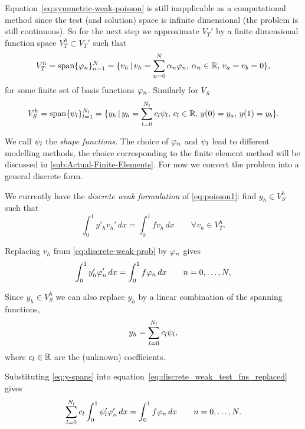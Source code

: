 Equation~\eqref{eq:symmetric-weak-poisson} is still inapplicable as a
computational method since the test (and solution) space is infinite dimensional
(\ie the problem is still continuous). So for the next step we approximate
$V_{T}'$ by a finite dimensional function space $V_{T}^{h}\subset V_{T}'$ such
that
\begin{equation}
  V_{T}^{h}=\text{span} \{ \varphi_{n} \}_{n=1}^{N}
  =  \{v_h \,|\, v_h = \sum_{n=0}^{N}\alpha_{n} \varphi_{n},\, \alpha_{n} \in \mathbb{R},\, v_a = v_b =0 \},
  \label{eq:30}
\end{equation}
for some finite set of basis functions $\varphi_{n}$. Similarly for $V_S$
\begin{equation}
  \label{eq:34}
  V_{S}^{h}=\text{span} \{ \psi_{l} \}_{l=1}^{N_l}
  =  \{y_h \,|\, y_h = \sum_{l=0}^{N_l}c_{l} \psi_{l},\,
  c_{l} \in \mathbb{R},\, y(0) = y_a,\, y(1) = y_b \}.
\end{equation}

We call $\psi_l$ the \emph{shape functions}. The choice of $\varphi_{n}$
and $\psi_l$ lead to different modelling methods, the choice corresponding
to the finite element method will be discussed in \autoref{sub:Actual-Finite-Elements}. For now we convert the problem into a general discrete form.

We currently have the \emph{discrete weak formulation} of \eqref{eq:poisson1}: find $y_{h}\in V_{S}^{h}$ such that
\begin{equation}
  \int_{0}^{1}y'_{h}v_{h}'\, dx=\int_{0}^{1}fv_{h}\, dx\qquad\forall v_{h}\in V_{T}^{h}.
  \label{eq:discrete-weak-prob}
\end{equation}

Replacing $v_{h}$ from \eqref{eq:discrete-weak-prob} by $\varphi_{n}$
gives
\begin{equation}
  \int_{0}^{1} y'_{h} \varphi_{n}' \, dx = \int_{0}^{1}f\varphi_{n}\, dx\qquad n=0,\ldots,N,
  \label{eq:discrete_weak_test_fns_replaced}
\end{equation}

Since $y_{h}\in V_{S}^{h}$ we can also replace $y_{h}$ by a linear combination
of the spanning functions, \ie
\begin{equation}
  y_{h}=\sum_{l=0}^{N_l}c_{l}\psi_{l},
  \label{eq:y-spans}
\end{equation}
where $c_l \in \mathbb{R}$ are the (unknown) coefficients.

Substituting \eqref{eq:y-spans} into equation~\eqref{eq:discrete_weak_test_fns_replaced} gives
\begin{equation}
  \sum_{l=0}^{N_l}c_{l}\int_{0}^{1}\psi_{l}'\varphi'_{n}\, dx=\int_{0}^{1}f\varphi_{n}\, dx
  \qquad n=0,\ldots,N.
  \label{eq:31}
\end{equation}

